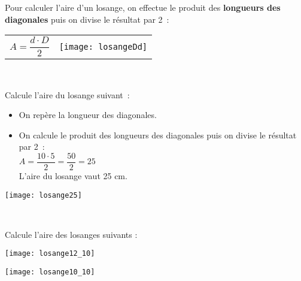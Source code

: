 
\begin{methode*1}

\begin{aconnaitre}
Pour calculer l’aire d’un losange, on effectue le produit des \textbf{\textcolor{H1}{longueurs des diagonales}} puis on divise le résultat par 2 : 

\begin{tabularx}{\textwidth}{XX}
$A = \dfrac{d \cdot D}{2}$ & \texttt{[image: losangeDd]} \\
 \end{tabularx} \\
 \end{aconnaitre}
 
 \begin{exemple*1}
Calcule l’aire du losange suivant :
\begin{minipage}[c]{0.68\textwidth}
\begin{itemize}
 \item On repère la longueur des diagonales.
 \item On calcule le produit des longueurs des diagonales puis on divise le résultat par 2 : \\[0.3em]
$A = \dfrac{10 \cdot 5}{2} = \dfrac{50}{2} = 25$ \\[0.3em]
L'aire du losange vaut 25 cm.
 \end{itemize}
 \end{minipage} \hfill%
 \begin{minipage}[c]{0.2\textwidth}
 \texttt{[image: losange25]}
 \end{minipage} \\
\end{exemple*1}

 
 \exercice
Calcule l’aire des losanges suivants :
\begin{colenumerate}{2}
 \item
 
 \texttt{[image: losange12\_10]}
 \item
 
 \texttt{[image: losange10\_10]}
 \end{colenumerate}

\end{methode*1}
